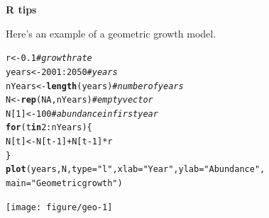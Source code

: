 \documentclass[12pt]{article}\usepackage[]{graphicx}\usepackage[]{xcolor}
\makeatletter
\newcommand{\hlnum}[1]{\textcolor[rgb]{0.686,0.059,0.569}{#1}}%
\newcommand{\hlsng}[1]{\textcolor[rgb]{0.192,0.494,0.8}{#1}}%
\newcommand{\hlcom}[1]{\textcolor[rgb]{0.678,0.584,0.686}{\textit{#1}}}%
\newcommand{\hlopt}[1]{\textcolor[rgb]{0,0,0}{#1}}%
\newcommand{\hldef}[1]{\textcolor[rgb]{0.345,0.345,0.345}{#1}}%
\newcommand{\hlkwa}[1]{\textcolor[rgb]{0.161,0.373,0.58}{\textbf{#1}}}%
\newcommand{\hlkwb}[1]{\textcolor[rgb]{0.69,0.353,0.396}{#1}}%
\newcommand{\hlkwc}[1]{\textcolor[rgb]{0.333,0.667,0.333}{#1}}%
\newcommand{\hlkwd}[1]{\textcolor[rgb]{0.737,0.353,0.396}{\textbf{#1}}}%
\newenvironment{kframe}{%
 \def\at@end@of@kframe{}%
 \ifinner\ifhmode%
  \def\at@end@of@kframe{\end{minipage}}%
  \begin{minipage}{\columnwidth}%
 \fi\fi%
 \def\FrameCommand##1{\hskip\@totalleftmargin \hskip-\fboxsep
 \colorbox{shadecolor}{##1}\hskip-\fboxsep
     \hskip-\linewidth \hskip-\@totalleftmargin \hskip\columnwidth}%
 \MakeFramed {\advance\hsize-\width
   \@totalleftmargin\z@ \linewidth\hsize
   \@setminipage}}%
 {\par\unskip\endMakeFramed%
 \at@end@of@kframe}
\newenvironment{knitrout}{}{} %
\makeatother
\begin{document}
\newpage

{\bf R tips \\}


Here's an example of a geometric growth model.
\begin{knitrout}
\color{fgcolor}\begin{kframe}
\begin{alltt}
\hldef{r} \hlkwb{<-} \hlnum{0.1}                      \hlcom{# growth rate}
\hldef{years} \hlkwb{<-} \hlnum{2001}\hlopt{:}\hlnum{2050}            \hlcom{# years}
\hldef{nYears} \hlkwb{<-} \hlkwd{length}\hldef{(years)}       \hlcom{# number of years}
\hldef{N} \hlkwb{<-} \hlkwd{rep}\hldef{(}\hlnum{NA}\hldef{, nYears)}          \hlcom{# empty vector}
\hldef{N[}\hlnum{1}\hldef{]} \hlkwb{<-} \hlnum{100}                   \hlcom{# abundance in first year}
\hlkwa{for}\hldef{(t} \hlkwa{in} \hlnum{2}\hlopt{:}\hldef{nYears) \{}
    \hldef{N[t]} \hlkwb{<-} \hldef{N[t}\hlopt{-}\hlnum{1}\hldef{]} \hlopt{+} \hldef{N[t}\hlopt{-}\hlnum{1}\hldef{]}\hlopt{*}\hldef{r}
\hldef{\}}
\hlkwd{plot}\hldef{(years, N,} \hlkwc{type}\hldef{=}\hlsng{"l"}\hldef{,} \hlkwc{xlab}\hldef{=}\hlsng{"Year"}\hldef{,} \hlkwc{ylab}\hldef{=}\hlsng{"Abundance"}\hldef{,}
     \hlkwc{main}\hldef{=}\hlsng{"Geometric growth"}\hldef{)}
\end{alltt}
\end{kframe}

{\centering \texttt{[image: figure/geo-1]} 

}


\end{knitrout}



\end{document}
